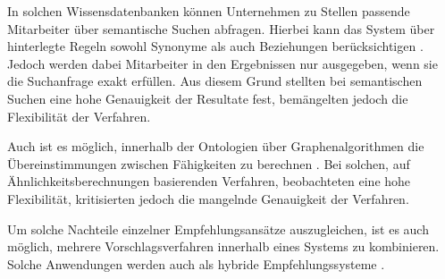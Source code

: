 In solchen Wissensdatenbanken können Unternehmen zu Stellen passende Mitarbeiter über semantische Suchen abfragen. Hierbei kann das System über hinterlegte Regeln sowohl Synonyme als auch Beziehungen berücksichtigen \cite[S. 2f.]{singto:2013}. Jedoch werden dabei Mitarbeiter in den Ergebnissen nur ausgegeben, wenn sie die Suchanfrage exakt erfüllen. Aus diesem Grund stellten \textcite[S. 3]{bianchini:2008} bei semantischen Suchen eine hohe Genauigkeit der Resultate fest, bemängelten jedoch die Flexibilität der Verfahren.

Auch ist es möglich, innerhalb der Ontologien über Graphenalgorithmen die Übereinstimmungen zwischen Fähigkeiten zu berechnen \cite[S. 1f.]{balachander:2018}. Bei solchen, auf Ähnlichkeitsberechnungen basierenden Verfahren, beobachteten \textcite[S. 4]{bianchini:2008} eine hohe Flexibilität, kritisierten jedoch die mangelnde Genauigkeit der Verfahren.

Um solche Nachteile einzelner Empfehlungsansätze auszugleichen, ist es auch möglich, mehrere Vorschlagsverfahren innerhalb eines Systems zu kombinieren. Solche Anwendungen werden auch als hybride Empfehlungssysteme \cite[S. 200]{recommenderSystems:2016}.


